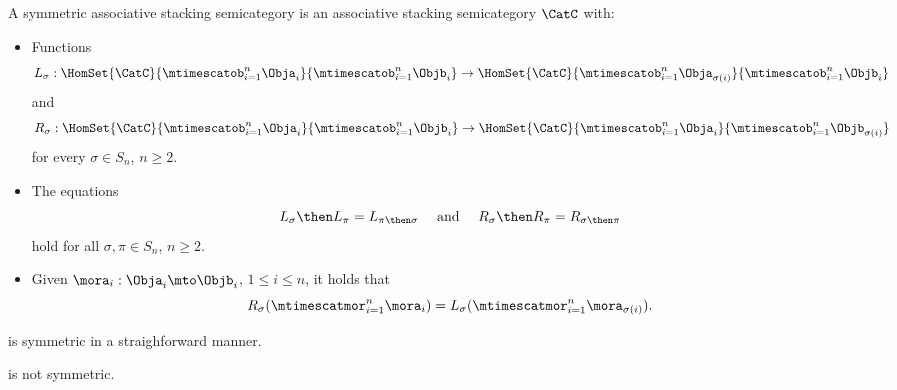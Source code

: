 \begin{ctdefinition}
    \label{def:symmetric-stacking-category}
A symmetric associative stacking semicategory is an associative stacking semicategory $\CatC$ with:

\constit

\begin{itemize}
\item Functions
\begin{equation}
L_\sigma : \HomSet{\CatC}{\mtimescatob_{i=1}^n \Obja_i}{\mtimescatob_{i=1}^n \Objb_i} \to \HomSet{\CatC}{\mtimescatob_{i=1}^n \Obja_{\sigma(i)}}{\mtimescatob_{i=1}^n \Objb_i}
\end{equation}
and
\begin{equation}
R_\sigma : \HomSet{\CatC}{\mtimescatob_{i=1}^n \Obja_i}{\mtimescatob_{i=1}^n \Objb_i} \to \HomSet{\CatC}{\mtimescatob_{i=1}^n \Obja_i}{\mtimescatob_{i=1}^n \Objb_{\sigma(i)}}
\end{equation}
for every $\sigma \in S_n$, $n \geq 2$.
\end{itemize}

\condit

\begin{itemize}
\item The equations
\begin{equation}
L_\sigma \then L_\pi = L_{\pi \then \sigma}
\quad \text{ and } \quad
R_\sigma \then R_\pi = R_{\sigma \then \pi}
\end{equation}
hold for all $\sigma, \pi \in S_n$, $n \geq 2$.
\item
Given $\mora_i : \Obja_i \mto \Objb_i$, $1 \leq i \leq n$, it holds that
\begin{equation}
R_\sigma ( \mtimescatmor_{i=1}^n \mora_i ) = L_\sigma(  \mtimescatmor_{i=1}^n \mora_{\sigma(i)} ).
\end{equation}

\end{itemize}
\end{ctdefinition}


\begin{example}
    \SetL is symmetric in a straighforward manner.
\end{example}

\begin{lemma}
    \Effects is not symmetric.
\end{lemma}

